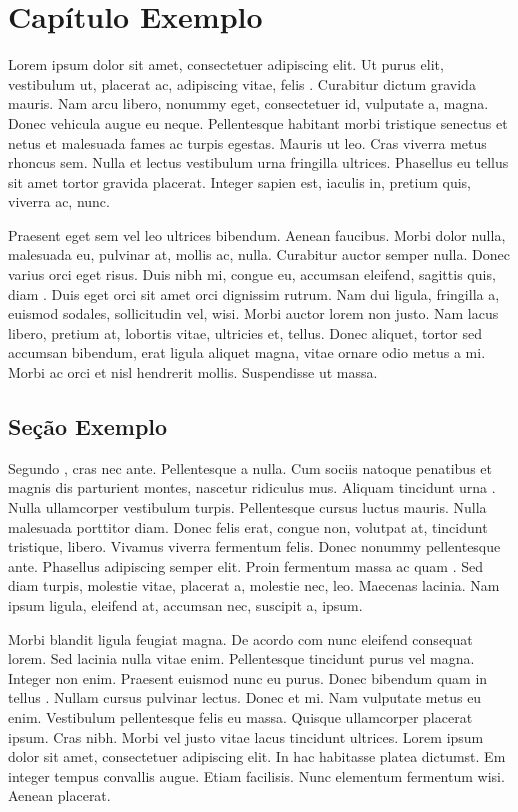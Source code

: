 
\chapter{Capítulo Exemplo}
\noindent
Lorem ipsum dolor sit amet, consectetuer adipiscing elit. Ut purus elit, vestibulum ut, placerat ac, adipiscing vitae, felis \cite{Salles2014}. Curabitur dictum gravida mauris. Nam arcu libero, nonummy eget, consectetuer id, vulputate a, magna. Donec vehicula augue eu neque. Pellentesque habitant morbi tristique senectus et netus et malesuada fames ac turpis egestas. Mauris ut leo. Cras viverra metus rhoncus sem. Nulla et lectus vestibulum urna fringilla ultrices. Phasellus eu tellus sit amet tortor gravida placerat. Integer sapien est, iaculis in, pretium quis, viverra ac, nunc.

Praesent eget sem vel leo ultrices bibendum. Aenean faucibus. Morbi dolor nulla, malesuada eu, pulvinar at, mollis ac, nulla. Curabitur auctor semper nulla. Donec varius orci eget risus. Duis nibh mi, congue eu, accumsan eleifend, sagittis quis, diam \cite{Justel2014}. Duis eget orci sit amet orci dignissim rutrum. Nam dui ligula, fringilla a, euismod sodales, sollicitudin vel, wisi. Morbi auctor lorem non justo. Nam lacus libero, pretium at, lobortis vitae, ultricies et, tellus. Donec aliquet, tortor sed accumsan bibendum, erat ligula aliquet magna, vitae ornare odio metus a mi. Morbi ac orci et nisl hendrerit mollis. Suspendisse ut massa.

\section{Seção Exemplo}
Segundo \citeauthor{Goldschmidt2005}, cras nec ante. Pellentesque a nulla. Cum sociis natoque penatibus et magnis dis parturient montes, nascetur ridiculus mus. Aliquam tincidunt urna \cite{Rakocevic2014}. Nulla ullamcorper vestibulum turpis. Pellentesque cursus luctus mauris. Nulla malesuada porttitor diam. Donec felis erat, congue non, volutpat at, tincidunt tristique, libero. Vivamus viverra fermentum felis. Donec nonummy pellentesque ante. Phasellus adipiscing semper elit. Proin fermentum massa ac quam \cite{Lara2014}. Sed diam turpis, molestie vitae, placerat a, molestie nec, leo. Maecenas lacinia. Nam ipsum ligula, eleifend at, accumsan nec, suscipit a, ipsum.

Morbi blandit ligula feugiat magna. De acordo com  \citeauthor{Soares2013} nunc eleifend consequat lorem. Sed lacinia nulla vitae enim. Pellentesque tincidunt purus vel magna. Integer non enim. Praesent euismod nunc eu purus. Donec bibendum quam in tellus \cite{Yoko2003}. Nullam cursus pulvinar lectus. Donec et mi. Nam vulputate metus eu enim. Vestibulum pellentesque felis eu massa. Quisque ullamcorper placerat ipsum. Cras nibh. Morbi vel justo vitae lacus tincidunt ultrices. Lorem ipsum dolor sit amet, consectetuer adipiscing elit. In hac habitasse platea dictumst. Em \citeauthor{Dias2013} integer tempus convallis augue. Etiam facilisis. Nunc elementum fermentum wisi. Aenean placerat.

